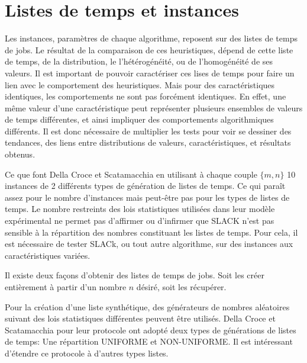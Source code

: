 \documentclass[a4paper,12pt]{report}
\theoremstyle{plain}				%
\theoremstyle{definition}				%
\newcommand\dcs{Della Croce et Scatamacchia\xspace}
\begin{document}
\section{Listes de temps et instances} \label{sec:listeTempsInstances}
Les instances, paramètres de chaque algorithme, reposent sur des listes de temps de jobs.
Le résultat de la comparaison de ces heuristiques, dépend de cette liste de temps, de la distribution, 
  le l'hétérogénéité, ou de l'homogénéité de ses valeurs. 
Il est important de pouvoir caractériser ces lises de temps pour faire un lien avec le comportement 
  des heuristiques. 
Mais pour des caractéristiques identiques, les comportements ne sont pas forcément identiques. 
En effet, une même valeur d'une caractéristique peut représenter plusieurs ensembles de 
  valeurs de temps différentes, et ainsi impliquer des comportements algorithmiques différents. 
Il est donc nécessaire de multiplier les tests pour voir se dessiner des tendances, 
  des liens entre distributions de valeurs, caractéristiques, et résultats obtenus.

Ce que font \dcs en utilisant à chaque couple $\{m,n\}$ 10 instances de 2 différents types de 
  génération de listes de temps. 
Ce qui paraît assez pour le nombre d'instances mais peut-être pas pour les types de listes de temps. 
Le nombre restreints des lois statistiques utilisées dans leur modèle expérimental ne permet pas 
  d'affirmer ou d'infirmer que SLACK n'est pas sensible à la répartition des nombres constituant 
  les listes de temps. 
Pour cela, il est nécessaire de tester SLACk, ou tout autre algorithme, sur des instances aux caractéristiques variées.


Il existe deux façons d'obtenir des listes de temps de jobs. 
Soit les créer entièrement à partir d'un nombre $n$ désiré, soit les récupérer.

Pour la création d'une liste synthétique, des générateurs de nombres aléatoires suivant des lois statistiques différentes peuvent être utilisés.  
\dcs pour leur protocole ont adopté deux types de générations de listes de temps: 
  Une répartition UNIFORME et NON-UNIFORME.
Il est intéressant d'étendre ce protocole à d'autres types listes.
\end{document}
